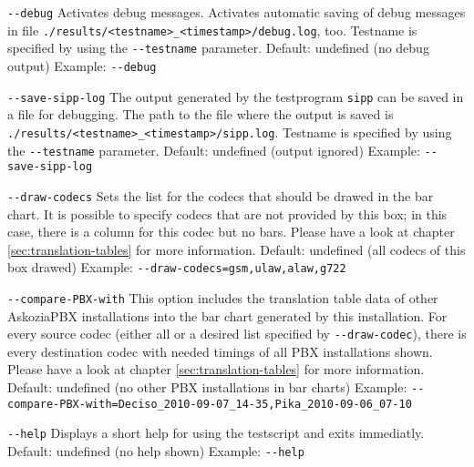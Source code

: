 \begin{description}
\item {\texttt{-{}-debug}} \newline
Activates debug messages. Activates automatic saving of debug messages
in file \texttt{./results/<testname>\_<timestamp>/debug.log}, too.
Testname is specified by using the \texttt{-{}-testname} parameter.
\newline Default: undefined (no debug output)
\newline Example: \texttt{-{}-debug}

\item {\texttt{-{}-save-sipp-log}} \newline
The output generated by the testprogram \texttt{sipp} can be saved in a file for debugging.
The path to the file where the output is saved is \newline
\texttt{./results/<testname>\_<timestamp>/sipp.log}.
Testname is specified by using the \texttt{-{}-testname} parameter.
\newline Default: undefined (output ignored)
\newline Example: \texttt{-{}-save-sipp-log}

\item {\texttt{-{}-draw-codecs}} \newline
Sets the list for the codecs that should be drawed in the bar chart.
It is possible to specify codecs that are not provided by this box;
in this case, there is a column for this codec but no bars.
Please have a look at chapter \ref{sec:translation-tables} for more information.
\newline Default: undefined (all codecs of this box drawed)
\newline Example: \texttt{-{}-draw-codecs=gsm,ulaw,alaw,g722}

\item {\texttt{-{}-compare-PBX-with}} \newline
This option includes the translation table data of other AskoziaPBX installations
into the bar chart generated by this installation. For every source codec
(either all or a desired list specified by \texttt{-{}-draw-codec}),
there is every destination codec with needed timings of all PBX installations shown.
Please have a look at chapter \ref{sec:translation-tables} for more information.
\newline Default: undefined (no other PBX installations in bar charts)
\newline Example: \texttt{-{}-compare-PBX-with=Deciso\_2010-09-07\_14-35,Pika\_2010-09-06\_07-10}

\item {\texttt{-{}-help}} \newline
Displays a short help for using the testscript and exits immediatly.
\newline Default: undefined (no help shown)
\newline Example: \texttt{-{}-help}

\end{description}

